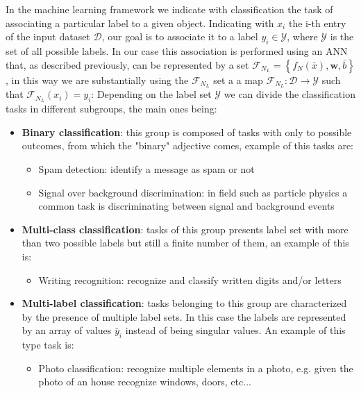 In the machine learning framework we indicate with classification the task of associating a particular label to a given object. 
Indicating with $x_i$ the i-th entry of the input dataset $\mathcal{D}$, our goal is to associate it to a label $y_i\in\mathcal{Y}$, where $\mathcal{Y}$ is the set of all possible labels. In our case this association is performed using an ANN that, as described previously, can be represented by a set $\mathcal{F}_{N_L} = \left\{ f_N(\bar{x}), \boldsymbol{w}, \bar{b}\right\}$, in this way we are substantially using the $\mathcal{F}_{N_L}$ set a a map
$\mathcal{F}_{N_L}: \mathcal{D} \to  \mathcal{Y}$ such that $\mathcal{F}_{N_L}(x_i)=y_i$:
Depending on the label set $\mathcal{Y}$ we can divide the classification tasks in different subgroups, the main ones being:
\begin{itemize}[]
    \item \textbf{Binary classification}: this group is composed of tasks with only to possible outcomes, from which the "binary" adjective comes, example of this tasks are:
    \begin{itemize}
        \item Spam detection: identify a message as spam or not
    \item Signal over background discrimination: in field such as particle physics a common task is discriminating between signal and background events
    \end{itemize}
    \item \textbf{Multi-class classification}: tasks of this group presents label set with more than two possible labels but still a finite number of them, an example of this is:
    \begin{itemize}
        \item Writing recognition: recognize and classify written digits and/or letters
    \end{itemize}
    \item \textbf{Multi-label classification}: tasks belonging to this group are characterized by the presence of multiple label
    sets. In this case the labels are represented by an array of values $\bar{y}_i$ instead of being singular values. An example of this type task is:
    \begin{itemize}
        \item Photo classification: recognize multiple elements in a photo, e.g. given the photo of an house recognize windows, doors, etc...
    \end{itemize}
\end{itemize}

